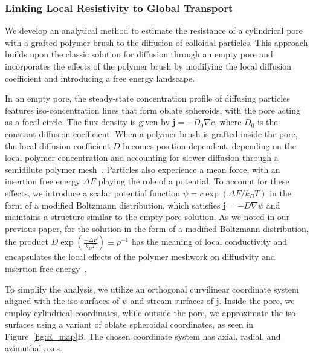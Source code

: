 \documentclass[12pt, a4paper]{article}
\begin{document}

\subsubsection{Linking Local Resistivity to Global Transport}

We develop an analytical method to estimate the resistance of a cylindrical pore with a grafted polymer brush to the diffusion of colloidal particles. 
This approach builds upon the classic solution for diffusion through an empty pore and incorporates the effects of the polymer brush by modifying the local diffusion coefficient and introducing a free energy landscape.

In an empty pore, the steady-state concentration profile of diffusing particles features iso-concentration lines that form oblate spheroids, with the pore acting as a focal circle.
The flux density is given by $\mathbf{j} = -D_0 \nabla c$, where $D_0$ is the constant diffusion coefficient.
When a polymer brush is grafted inside the pore, the local diffusion coefficient $D$ becomes position-dependent, depending on the local polymer concentration and accounting for slower diffusion through a semidilute polymer mesh~\cite{Cai2011}.
Particles also experience a mean force, with an insertion free energy $\Delta F$ playing the role of a potential. To account for these effects, we introduce a scalar potential function $\psi = c\exp(\Delta F / k_B T)$ in the form of a modified Boltzmann distribution, which satisfies $\mathbf{j} = -D \nabla \psi$ and maintains a structure similar to the empty pore solution.
As we noted in our previous paper, for the solution in the form of a modified Boltzmann distribution, the product $D \exp\left( \frac{-\Delta F}{k_B T} \right) \equiv \rho^{-1}$ has the meaning of local conductivity and encapsulates the local effects of the polymer meshwork on diffusivity and insertion free energy~\cite{Laktionov2023}.

To simplify the analysis, we utilize an orthogonal curvilinear coordinate system aligned with the iso-surfaces of $\psi$ and stream surfaces of $\bm{j}$.
Inside the pore, we employ cylindrical coordinates, while outside the pore, we approximate the iso-surfaces using a variant of oblate spheroidal coordinates, as seen in Figure~\ref{fig:R_map}B. The chosen coordinate system has axial, radial, and azimuthal axes.
\end{document}
